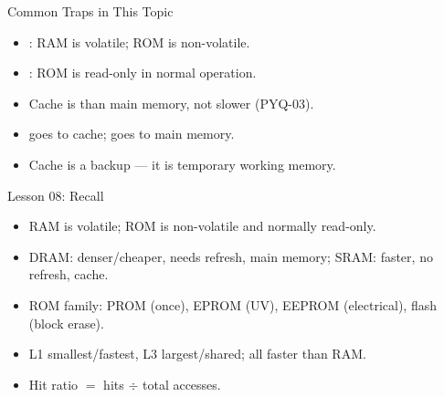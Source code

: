 \documentclass[aspectratio=169]{beamer}
\begin{document}
\begin{frame}{Common Traps in This Topic}
  \begin{itemize}
    \item {}: RAM is volatile; ROM is non-volatile.
    \item {}: ROM is read-only in normal operation.
    \item Cache is  than main memory, not slower (PYQ-03).
    \item {} goes to cache;  goes to main memory.
    \item Cache is  a backup --- it is temporary working memory.
  \end{itemize}
\end{frame}

\begin{frame}{Lesson 08: Recall}
  \begin{itemize}
    \item RAM is volatile; ROM is non-volatile and normally read-only.
    \item DRAM: denser/cheaper, needs refresh, main memory; SRAM: faster,
      no refresh, cache.
    \item ROM family: PROM (once), EPROM (UV), EEPROM (electrical), flash
      (block erase).
    \item L1 smallest/fastest, L3 largest/shared; all faster than RAM.
    \item Hit ratio $=$ hits $\div$ total accesses.
  \end{itemize}
\end{frame}
\end{document}

